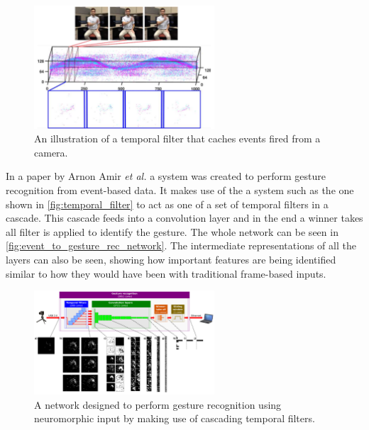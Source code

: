 \begin{figure}[htb]
      \centering
      \includegraphics[width=0.6\textwidth]{background/images/temporal_filter.png}
      \caption{An illustration of a temporal filter that caches events fired from a camera\cite{eventBasedGestureRec}.}
      \label{fig:temporal_filter}
\end{figure}

In a paper by Arnon Amir \textit{et al.}\cite{eventBasedGestureRec} a system was created to perform gesture recognition from event-based data. It makes use of the a system such as the one shown in \autoref{fig:temporal_filter} to act as one of a set of temporal filters in a cascade. This cascade feeds into a convolution layer and in the end a winner takes all filter is applied to identify the gesture. The whole network can be seen in \autoref{fig:event_to_gesture_rec_network}. The intermediate representations of all the layers can also be seen, showing how important features are being identified similar to how they would have been with traditional frame-based inputs.

\begin{figure}[htb]
      \centering
      \includegraphics[width=0.6\textwidth]{background/images/event_to_gesture_rec_network.png}
      \caption{A network designed to perform gesture recognition using neuromorphic input by making use of cascading temporal filters\cite{eventBasedGestureRec}.}
      \label{fig:event_to_gesture_rec_network}
\end{figure}

